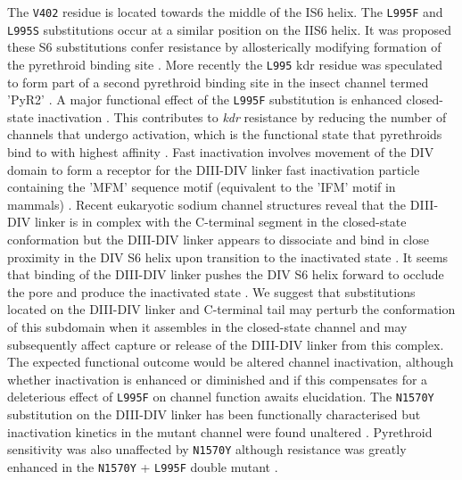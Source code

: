 \documentclass[a4paper,11pt,abstracton,hidelinks]{scrartcl}
\begin{document}
%
The \texttt{V402} residue is located towards the middle of the IS6 helix. 
%
The \texttt{L995F} and \texttt{L995S} substitutions occur at a similar position on the IIS6 helix. 
%
It was proposed these S6 substitutions confer resistance by allosterically modifying formation of the pyrethroid binding site \cite{OReilly2006}.
%
More recently the \texttt{L995} kdr residue was speculated to form part of a second pyrethroid binding site in the insect channel termed 'PyR2' \cite{Du2013, Du2015}.
%
A major functional effect of the \texttt{L995F} substitution is enhanced closed-state inactivation  \cite{Vais2000}. 
%
This contributes to \textit{kdr} resistance by reducing the number of channels that undergo activation, which is the functional state that pyrethroids bind to with highest affinity \cite{Vais2000}. 
%
Fast inactivation involves movement of the DIV domain to form a receptor for the DIII-DIV linker fast inactivation particle containing the 'MFM' sequence motif (equivalent to the 'IFM' motif in mammals) \cite{Capes2013, Dong2014}. 
%
Recent eukaryotic sodium channel structures reveal that the DIII-DIV linker is in complex with the C-terminal segment in the closed-state conformation but the DIII-DIV linker appears to dissociate and bind in close proximity in the DIV S6 helix upon transition to the inactivated state \cite{Shen2017, Yan2017}. 
%
It seems that binding of the DIII-DIV linker pushes the DIV S6 helix forward to occlude the pore and produce the inactivated state \cite{Yan2017}.
%
We suggest that substitutions located on the DIII-DIV linker and C-terminal tail may perturb the conformation of this subdomain when it assembles in the closed-state channel and may subsequently affect capture or release of the DIII-DIV linker from this complex. 
%
The expected functional outcome would be altered channel inactivation, although whether inactivation is enhanced or diminished and if this compensates for a deleterious effect of \texttt{L995F} on channel function awaits elucidation. 
%
The \texttt{N1570Y} substitution on the DIII-DIV linker has been functionally characterised but inactivation kinetics in the mutant channel were found unaltered \cite{Wang2015}. 
%
Pyrethroid sensitivity was also unaffected by \texttt{N1570Y} although resistance was greatly enhanced in the \texttt{N1570Y} + \texttt{L995F} double mutant \cite{Wang2015}.
%
\end{document}
